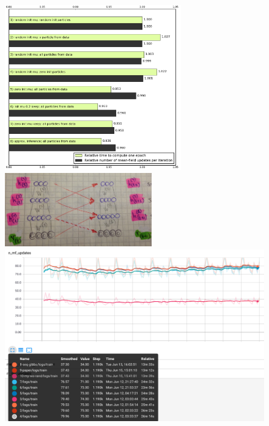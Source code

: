 \begin{figure}[h]
\begin{mdframed}
\centering
\includegraphics[width=3in]{dbm-mnist/mf_approaches.png}
\quad
\includegraphics[width=2.5in]{dbm-mnist/parallel_gibbs.jpg}
\\[2em]
\includegraphics[width=4.5in]{dbm-mnist/n_mf_approaches.png}

\end{mdframed}
\end{figure}
